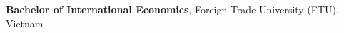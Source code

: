 
\begin{scholarship}
					{\textbf{Bachelor of International Economics}, Foreign Trade University (FTU), Vietnam}
\end{scholarship}